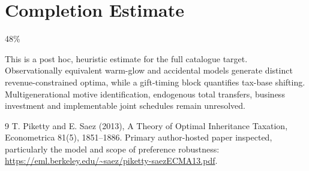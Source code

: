 \documentclass[11pt]{article}
\begin{document}
\section{Completion Estimate}
48\%

This is a post hoc, heuristic estimate for the full catalogue target.
Observationally equivalent warm-glow and accidental models generate distinct revenue-constrained optima, while a gift-timing block quantifies tax-base shifting. Multigenerational motive identification, endogenous total transfers, business investment and implementable joint schedules remain unresolved.

\begin{thebibliography}{9}
 T. Piketty and E. Saez (2013), A Theory of Optimal Inheritance Taxation, Econometrica 81(5), 1851--1886. Primary author-hosted paper inspected, particularly the model and scope of preference robustness:
\url{https://eml.berkeley.edu/~saez/piketty-saezECMA13.pdf}.
\end{thebibliography}
\end{document}
